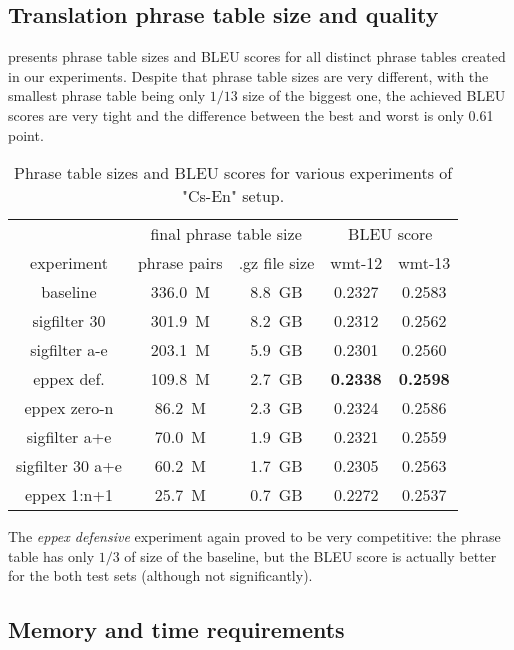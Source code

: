 \subsection{Translation phrase table size and quality}

 presents phrase table sizes and BLEU scores for all
distinct phrase tables created in our experiments.
Despite that phrase table sizes are very different, with the smallest phrase table being only
$1/13$ size of the biggest one, the achieved BLEU scores are very tight and the difference
between the best and worst is only 0.61 point.

\begin{table}[ht]
\centering
\begin{tabular}{ | c | c c | c c | }
\hline
 & \multicolumn{2}{|c|}{final phrase table size} & \multicolumn{2}{|c|}{BLEU score} \\
experiment & phrase pairs & .gz file size & wmt-12 & wmt-13 \\
\hline
\hline
baseline          & 336.0~M & 8.8~GB & 0.2327 & 0.2583 \\
sigfilter 30      & 301.9~M & 8.2~GB & 0.2312 & 0.2562 \\
sigfilter a-e     & 203.1~M & 5.9~GB & 0.2301 & 0.2560 \\
eppex def.        & 109.8~M & 2.7~GB & \textbf{0.2338} & \textbf{0.2598} \\
eppex zero-n      &  86.2~M & 2.3~GB & 0.2324 & 0.2586 \\
sigfilter a+e     &  70.0~M & 1.9~GB & 0.2321 & 0.2559 \\
sigfilter 30 a+e  &  60.2~M & 1.7~GB & 0.2305 & 0.2563 \\
eppex 1:n+1       &  25.7~M & 0.7~GB & 0.2272 & 0.2537 \\
\hline
\end{tabular}
\caption{\label{cs-en-wmt13-pt-size-and-bleu}
Phrase table sizes and BLEU scores for various experiments of "Cs-En" setup.}
\end{table}

The \emph{eppex defensive} experiment again proved to be very competitive:
the phrase table has only $1/3$ of size of the baseline,
but the BLEU score is actually better for the both test sets (although not significantly).

\subsection{Memory and time requirements}

